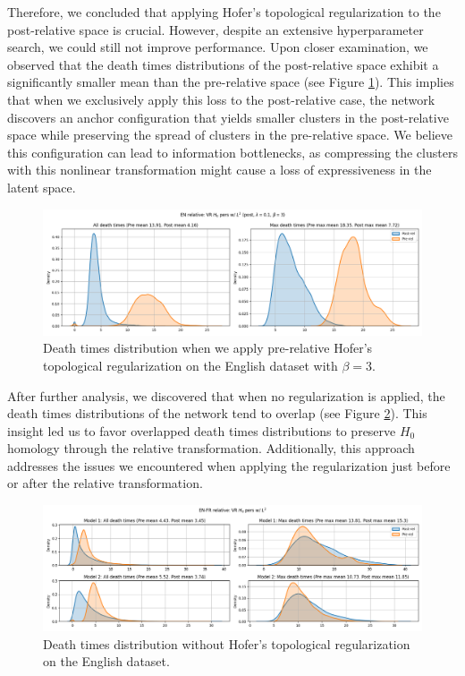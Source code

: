 \documentclass[../main.tex]{subfiles}
\begin{document}
Therefore, we concluded that applying Hofer's topological regularization to the post-relative space is crucial. However, despite an extensive hyperparameter search, we could still not improve performance. Upon closer examination, we observed that the death times distributions of the post-relative space exhibit a significantly smaller mean than the pre-relative space (see Figure \ref{fig:distPost}). This implies that when we exclusively apply this loss to the post-relative case, the network discovers an anchor configuration that yields smaller clusters in the post-relative space while preserving the spread of clusters in the pre-relative space. We believe this configuration can lead to information bottlenecks, as compressing the clusters with this nonlinear transformation might cause a loss of expressiveness in the latent space.\\

\begin{figure}[!ht]
    \centering
    \includegraphics[width=\textwidth]{figures/rs/en_relative_post_3_seed0.png} 
    \caption{Death times distribution when we apply pre-relative Hofer's topological regularization on the English dataset with $\beta=3$.}
    \label{fig:distPost}
\end{figure}

After further analysis, we discovered that when no regularization is applied, the death times distributions of the network tend to overlap (see Figure \ref{fig:distVanilla}). This insight led us to favor overlapped death times distributions to preserve $H_0$ homology through the relative transformation. Additionally, this approach addresses the issues we encountered when applying the regularization just before or after the relative transformation.\\

\begin{figure}[!ht]
    \centering
    \includegraphics[width=\textwidth]{figures/rs/en_fr_relative_seed1.png} 
    \caption{Death times distribution without Hofer's topological regularization on the English dataset.}
    \label{fig:distVanilla}
\end{figure}
\end{document}
